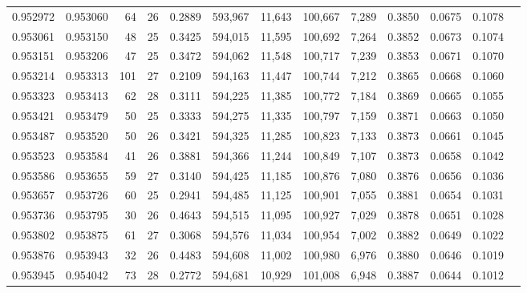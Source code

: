 \begin{tabular}{rrrrrrrrrrrrr}
0.952972 & 0.953060 &    64 &  26 &                                     0.2889 & 593,967 &  11,643 & 100,667 &   7,289 & 0.3850 & 0.0675 & 0.1078 \\
0.953061 & 0.953150 &    48 &  25 &                                     0.3425 & 594,015 &  11,595 & 100,692 &   7,264 & 0.3852 & 0.0673 & 0.1074 \\
0.953151 & 0.953206 &    47 &  25 &                                     0.3472 & 594,062 &  11,548 & 100,717 &   7,239 & 0.3853 & 0.0671 & 0.1070 \\
0.953214 & 0.953313 &   101 &  27 &                                     0.2109 & 594,163 &  11,447 & 100,744 &   7,212 & 0.3865 & 0.0668 & 0.1060 \\
0.953323 & 0.953413 &    62 &  28 &                                     0.3111 & 594,225 &  11,385 & 100,772 &   7,184 & 0.3869 & 0.0665 & 0.1055 \\
0.953421 & 0.953479 &    50 &  25 &                                     0.3333 & 594,275 &  11,335 & 100,797 &   7,159 & 0.3871 & 0.0663 & 0.1050 \\
0.953487 & 0.953520 &    50 &  26 &                                     0.3421 & 594,325 &  11,285 & 100,823 &   7,133 & 0.3873 & 0.0661 & 0.1045 \\
0.953523 & 0.953584 &    41 &  26 &                                     0.3881 & 594,366 &  11,244 & 100,849 &   7,107 & 0.3873 & 0.0658 & 0.1042 \\
0.953586 & 0.953655 &    59 &  27 &                                     0.3140 & 594,425 &  11,185 & 100,876 &   7,080 & 0.3876 & 0.0656 & 0.1036 \\
0.953657 & 0.953726 &    60 &  25 &                                     0.2941 & 594,485 &  11,125 & 100,901 &   7,055 & 0.3881 & 0.0654 & 0.1031 \\
0.953736 & 0.953795 &    30 &  26 &                                     0.4643 & 594,515 &  11,095 & 100,927 &   7,029 & 0.3878 & 0.0651 & 0.1028 \\
0.953802 & 0.953875 &    61 &  27 &                                     0.3068 & 594,576 &  11,034 & 100,954 &   7,002 & 0.3882 & 0.0649 & 0.1022 \\
0.953876 & 0.953943 &    32 &  26 &                                     0.4483 & 594,608 &  11,002 & 100,980 &   6,976 & 0.3880 & 0.0646 & 0.1019 \\
0.953945 & 0.954042 &    73 &  28 &                                     0.2772 & 594,681 &  10,929 & 101,008 &   6,948 & 0.3887 & 0.0644 & 0.1012 \\

\end{tabular}
